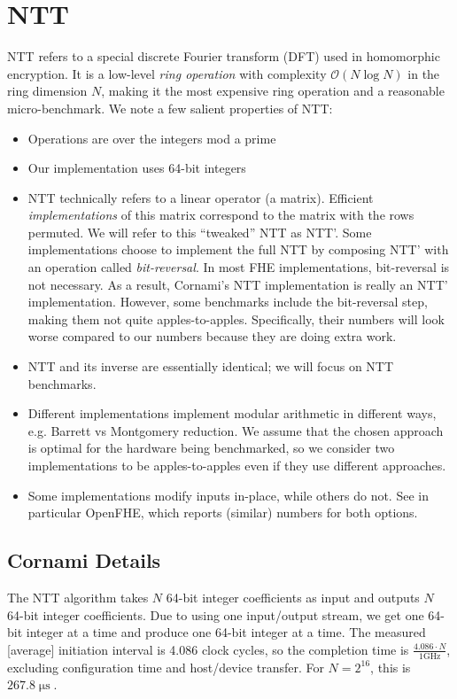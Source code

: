\documentclass{article}
\DeclareMathOperator*{\us}{\mu\mathrm{s}}
\begin{document}
	\section{NTT}
	NTT refers to a special discrete Fourier transform (DFT) used in homomorphic encryption. It is a low-level \emph{ring operation} with complexity $\mathcal{O}(N\log{N})$ in the ring dimension $N$, making it the most expensive ring operation and a reasonable micro-benchmark. We note a few salient properties of NTT:
	\begin{itemize}
		\item Operations are over the integers mod a prime
		\item Our implementation uses 64-bit integers
		\item NTT technically refers to a linear operator (a matrix). Efficient \emph{implementations} of this matrix correspond to the matrix with the rows permuted. We will refer to this ``tweaked'' NTT as NTT'. Some implementations choose to implement the full NTT by composing NTT' with an operation called \emph{bit-reversal}. In most FHE implementations, bit-reversal is not necessary. As a result, Cornami's NTT implementation is really an NTT' implementation. However, some benchmarks include the bit-reversal step, making them not quite apples-to-apples. Specifically, their numbers will look worse compared to our numbers because they are doing extra work.
		\item NTT and its inverse are essentially identical; we will focus on NTT benchmarks.
		\item Different implementations implement modular arithmetic in different ways, e.g. Barrett vs Montgomery reduction. We assume that the chosen approach is optimal for the hardware being benchmarked, so we consider two implementations to be apples-to-apples even if they use different approaches.
		\item Some implementations modify inputs in-place, while others do not. See in particular OpenFHE, which reports (similar) numbers for both options.
	\end{itemize}
	
	\subsection{Cornami Details}
	The NTT algorithm takes $N$ 64-bit integer coefficients as input and outputs $N$ 64-bit integer coefficients. Due to using one input/output stream, we get one 64-bit integer at a time and produce one 64-bit integer at a time. The measured [average] initiation interval is 4.086 clock cycles, so the completion time is $\frac{4.086\cdot N}{1\mathrm{GHz}}$, excluding configuration time and host/device transfer. For $N=2^{16}$, this is $267.8\us$.
	
\end{document}
